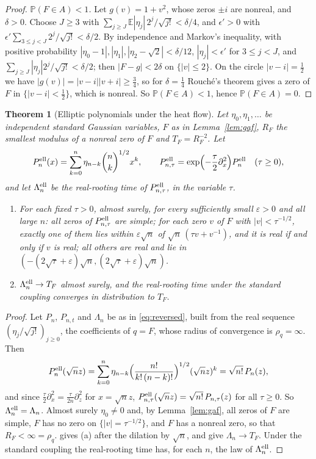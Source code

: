 \documentclass[11pt]{amsart}
\newtheorem{theorem}{Theorem}[section]
\theoremstyle{definition}
\theoremstyle{remark}
\numberwithin{equation}{section}
\newcommand{\E}{\mathbb{E}}
\newcommand{\PP}{\mathbb{P}}
\newcommand{\eps}{\varepsilon}
\begin{document}
\begin{proof}
\emph{$\PP(F\in A)<1$.} Let $g(v)=1+v^2$, whose zeros $\pm i$ are nonreal, and $\delta>0$. Choose $J\ge3$ with $\sum_{j\ge J}\E|\eta_j|\,2^j/\sqrt{j!}<\delta/4$, and $\epsilon'>0$ with $\epsilon'\sum_{3\le j<J}2^j/\sqrt{j!}<\delta/2$. By independence and Markov's inequality, with positive probability $|\eta_0-1|,|\eta_1|,|\eta_2-\sqrt2|<\delta/12$, $|\eta_j|<\epsilon'$ for $3\le j<J$, and $\sum_{j\ge J}|\eta_j|2^j/\sqrt{j!}<\delta/2$; then $|F-g|<2\delta$ on $\{|v|\le2\}$. On the circle $|v-i|=\frac12$ we have $|g(v)|=|v-i||v+i|\ge\frac34$, so for $\delta=\frac14$ Rouch\'e's theorem gives a zero of $F$ in $\{|v-i|<\frac12\}$, which is nonreal. So $\PP(F\in A)<1$, hence $\PP(F\in A)=0$.
\end{proof}

\begin{theorem}[Elliptic polynomials under the heat flow]\label{thm:elliptic}
Let $\eta_0,\eta_1,\dots$ be independent standard Gaussian variables, $F$ as in Lemma~\ref{lem:gaf}, $R_F$ the smallest modulus of a nonreal zero of $F$ and $T_F=R_F^{-2}$. Let
\[
P^{\rm ell}_n(x)=\sum_{k=0}^{n}\eta_{n-k}\binom nk^{1/2}x^k,\qquad P^{\rm ell}_{n,\tau}=\exp\Bigl(-\frac\tau2\partial_x^2\Bigr)P^{\rm ell}_n\quad(\tau\ge0),
\]
and let $\Lambda^{\rm ell}_n$ be the real-rooting time of $P^{\rm ell}_{n,\tau}$, in the variable $\tau$.
\begin{enumerate}
\item[(a)] For each fixed $\tau>0$, almost surely, for every sufficiently small $\eps>0$ and all large $n$: all zeros of $P^{\rm ell}_{n,\tau}$ are simple; for each zero $v$ of $F$ with $|v|<\tau^{-1/2}$, exactly one of them lies within $\eps\sqrt n$ of $\sqrt n\,(\tau v+v^{-1})$, and it is real if and only if $v$ is real; all others are real and lie in $(-(2\sqrt\tau+\eps)\sqrt n,(2\sqrt\tau+\eps)\sqrt n)$.
\item[(b)] $\Lambda^{\rm ell}_n\to T_F$ almost surely, and the real-rooting time under the standard coupling converges in distribution to $T_F$.
\end{enumerate}
\end{theorem}

\begin{proof}
Let $P_n$, $P_{n,t}$ and $\Lambda_n$ be as in \eqref{eq:reversed}, built from the real sequence $(\eta_j/\sqrt{j!})_{j\ge0}$, the coefficients of $q=F$, whose radius of convergence is $\rho_q=\infty$. Then
\[
P^{\rm ell}_n(\sqrt nz)=\sum_{k=0}^{n}\eta_{n-k}\Bigl(\frac{n!}{k!\,(n-k)!}\Bigr)^{1/2}(\sqrt nz)^k=\sqrt{n!}\,P_n(z),
\]
and since $\frac\tau2\partial_x^2=\frac\tau{2n}\partial_z^2$ for $x=\sqrt nz$, $P^{\rm ell}_{n,\tau}(\sqrt nz)=\sqrt{n!}\,P_{n,\tau}(z)$ for all $\tau\ge0$. So $\Lambda^{\rm ell}_n=\Lambda_n$. Almost surely $\eta_0\ne0$ and, by Lemma~\ref{lem:gaf}, all zeros of $F$ are simple, $F$ has no zero on $\{|v|=\tau^{-1/2}\}$, and $F$ has a nonreal zero, so that $R_F<\infty=\rho_q$. \cite[Theorem~\ref{M-thm:fixedq}(a)]{Main} gives (a) after the dilation by $\sqrt n$, and \cite[Theorem~\ref{M-thm:fixedq}(b),(c)]{Main} give $\Lambda_n\to T_F$. Under the standard coupling the real-rooting time has, for each $n$, the law of $\Lambda^{\rm ell}_n$.
\end{proof}
\end{document}
